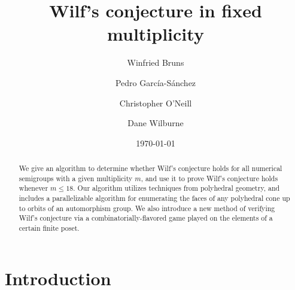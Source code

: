 \documentclass[12pt]{amsart}
\theoremstyle{definition}
\numberwithin{equation}{section}
\renewcommand\>{\rangle}
\newcommand\<{\langle}
\newcommand\0{\mathbf{0}}
\begin{document}


\mbox{}
\title{Wilf's conjecture in fixed multiplicity}

\author[Bruns]{Winfried Bruns}
\address{Institut f\"ur Mathematik\\Universit\"at Osnabr\"uck\\49074 Osnabr\"uck, Germany}

\author[Garc\'ia-S\'anchez]{Pedro Garc\'ia-S\'anchez}
\address{Departamento de \'Algebra\\Universidad de Granada\\18071 Granada, Espa\~na}

\author[O'Neill]{Christopher O'Neill}
\address{Mathematics Department\\San Diego State University\\San Diego, CA 92182}

\author[Wilburne]{Dane Wilburne}
\address{Department of Mathematics and Statistics\\York University\\Toronto, ON, Canada}

\date{\today}

\begin{abstract}
We give an algorithm to determine whether Wilf's conjecture holds for all numerical semigroups with a given multiplicity $m$, and use it to prove Wilf's conjecture holds whenever $m \le 18$.  Our algorithm utilizes techniques from polyhedral geometry, and includes a parallelizable algorithm for enumerating the faces of any polyhedral cone up to orbits of an automorphism group.  We also introduce a new method of verifying Wilf's conjecture via a combinatorially-flavored game played on the elements of a certain finite poset.  
\end{abstract}

\maketitle



\section{Introduction}%
\label{sec:intro}%
\end{document}
